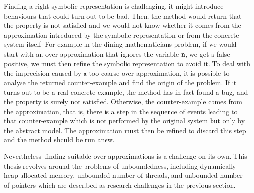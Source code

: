 

Finding a right symbolic representation 
is challenging, it might introduce
behaviours that could turn out to be bad.  Then, the method would
return that the property is not satisfied and we would not know
whether it comes from the approximation introduced by the symbolic representation or from the concrete system
itself.
For example in the dining mathematicians problem, if we would start with an over-approximation that ignores the variable $\tt n$, we get a false
  positive, we must then refine
    the symbolic representation to
  avoid it. To deal with the imprecision caused by a too coarse
over-approximation, it is possible to analyse the returned
counter-example and find the origin of the problem. If it turns out to
be a real concrete example, the method has in fact found a bug, and
the property is surely not satisfied. Otherwise, the counter-example
comes from the approximation, that is, there is a step in the sequence
of events leading to that counter-example which is not performed by
the original system but only by the abstract model. The approximation
must then be refined to discard this step and the method should be run
anew.

Nevertheless, finding suitable over-approximations is a challenge on
its own. %
This thesis revolves around the problems of unboundedness, including dynamically heap-allocated memory, unbounded number of threads, and unbounded number of pointers which are described as research challenges in the previous section.
